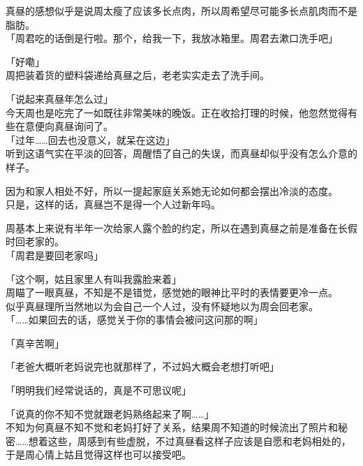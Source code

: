 真昼的感想似乎是说周太瘦了应该多长点肉，所以周希望尽可能多长点肌肉而不是脂肪。\\

「周君吃的话倒是行啦。那个，给我一下，我放冰箱里。周君去漱口洗手吧」

「好嘞」\\

周把装着货的塑料袋递给真昼之后，老老实实走去了洗手间。\\

\vspace{2\baselineskip}

「说起来真昼年怎么过」\\

今天周也是吃完了一如既往非常美味的晚饭。正在收拾打理的时候，他忽然觉得有些在意便向真昼询问了。\\

「过年……回去也没意义，就呆在这边」\\

听到这语气实在平淡的回答，周醒悟了自己的失误，而真昼却似乎没有怎么介意的样子。

因为和家人相处不好，所以一提起家庭关系她无论如何都会摆出冷淡的态度。\\

只是，这样的话，真昼岂不是得一个人过新年吗。

周基本上来说有半年一次给家人露个脸的约定，所以在遇到真昼之前是准备在长假时回老家的。\\

「周君是要回老家吗」

「这个啊，姑且家里人有叫我露脸来着」\\

周瞄了一眼真昼，不知是不是错觉，感觉她的眼神比平时的表情要更冷一点。\\

似乎真昼理所当然地以为会自己一个人过，没有怀疑地以为周会回老家。\\

「……如果回去的话，感觉关于你的事情会被问这问那的啊」

「真辛苦啊」

「老爸大概听老妈说完也就那样了，不过妈大概会老想打听吧」

「明明我们经常说话的，真是不可思议呢」

「说真的你不知不觉就跟老妈熟络起来了啊……」\\

不知为何真昼不知不觉和老妈打好了关系，结果周不知道的时候流出了照片和秘密……想着这些，周感到有些虚脱，不过真昼看这样子应该是自愿和老妈相处的，于是周心情上姑且觉得这样也可以接受吧。

